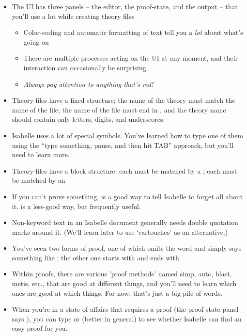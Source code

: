 \begin{itemize}
    \item The UI has three panels -- the editor, the proof-state, and the output -- that you'll use a lot while creating theory files

\begin{itemize}
        \item Color-coding and automatic formatting of text tell you a \textit{lot} about what's going on
        \item There are multiple processes acting on the UI at any moment, and their interaction can occasionally be surprising. 
        \item \textit{\textit{Always} pay attention to anything that's red!}
\end{itemize}

    \item Theory-files have a fixed structure; the name of the theory must match the name of the file; the name of the file must end in , and the theory name should contain only letters, digits, and underscores. 
    \item Isabelle uses a lot of special symbols. You've learned how to type one of them using the ``type something, pause, and then hit TAB'' approach, but you'll need to learn more. 
    \item Theory-files have a block structure: each  must be matched by a ; each  must be matched by an 
    \item If you can't prove something,  is a good way to tell Isabelle to forget all about it.  is a less-good way, but frequently useful.
    \item Non-keyword text in an Isabelle document generally needs double quotation marks around it. (We'll learn later to use `cartouches' as an alternative.)
    \item You've seen two forms of proof, one of which omits the word  and simply says something like ; the other one starts with  and ends with 
    \item Within proofs, there are various 'proof methods' named simp, auto, blast, metis, etc., that are good at different things, and you'll need to learn which ones are good at which things. For now, that's just a big pile of words. 
    \item When you're in a state of affairs that requires a proof (the proof-state panel says ), you can type  or (better in general)  to see whether Isabelle can find an easy proof for you. 

\end{itemize}
